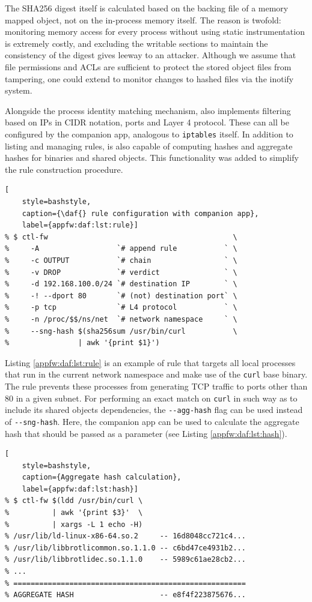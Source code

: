 The SHA256 digest itself is calculated based on the backing file of a memory mapped object, not on the in-process memory itself. The reason is twofold: monitoring memory access for every process without using static instrumentation is extremely costly, and excluding the writable sections to maintain the consistency of the digest gives leeway to an attacker. Although we assume that file permissions and ACLs are sufficient to protect the stored object files from tampering, one could extend \daf{} to monitor changes to hashed files via the inotify system.

Alongside the process identity matching mechanism, \daf{} also implements filtering based on IPs in CIDR notation, ports and Layer 4 protocol. These can all be configured by the \daf{} companion app, analogous to \texttt{iptables} itself. In addition to listing and managing rules, \daf{} is also capable of computing hashes and aggregate hashes for binaries and shared objects. This functionality was added to simplify the rule construction procedure.

\begin{lstlisting}[
    style=bashstyle,
    caption={\daf{} rule configuration with companion app},
    label={appfw:daf:lst:rule}]
% $ ctl-fw                                           \
%     -A                  `# append rule           ` \
%     -c OUTPUT           `# chain                 ` \
%     -v DROP             `# verdict               ` \
%     -d 192.168.100.0/24 `# destination IP        ` \
%     -! --dport 80       `# (not) destination port` \
%     -p tcp              `# L4 protocol           ` \
%     -n /proc/$$/ns/net  `# network namespace     ` \
%     --sng-hash $(sha256sum /usr/bin/curl           \
%                | awk '{print $1}')
\end{lstlisting}

Listing \ref{appfw:daf:lst:rule} is an example of \daf{} rule that targets all local processes that run in the current network namespace and make use of the \texttt{curl} base binary. The rule prevents these processes from generating TCP traffic to ports other than 80 in a given subnet. For performing an exact match on \texttt{curl} in such way as to include its shared objects dependencies, the \texttt{-{}-agg-hash} flag can be used instead of \texttt{-{}-sng-hash}. Here, the companion app can be used to calculate the aggregate hash that should be passed as a parameter (see Listing \ref{appfw:daf:lst:hash}).

\begin{lstlisting}[
    style=bashstyle,
    caption={Aggregate hash calculation},
    label={appfw:daf:lst:hash}]
% $ ctl-fw $(ldd /usr/bin/curl \
%          | awk '{print $3}'  \
%          | xargs -L 1 echo -H)
% /usr/lib/ld-linux-x86-64.so.2     -- 16d8048cc721c4...
% /usr/lib/libbrotlicommon.so.1.1.0 -- c6bd47ce4931b2...
% /usr/lib/libbrotlidec.so.1.1.0    -- 5989c61ae28cb2...
% ...
% ======================================================
% AGGREGATE HASH                    -- e8f4f223875676...
\end{lstlisting}


